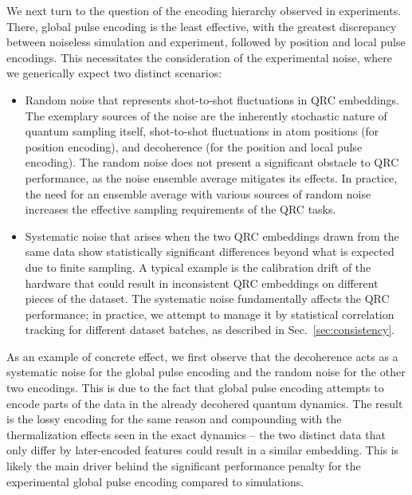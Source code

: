 \documentclass[english,floatfix,twocolumn,showpacs, aps, prx, reprint, superscriptaddress, longbibliography]{revtex4-2}
\begin{document}
We next turn to the question of the encoding hierarchy observed in experiments. There, global pulse encoding is the least effective, with the greatest discrepancy between noiseless simulation and experiment, followed by position and local pulse encodings. This necessitates the consideration of the experimental noise, where we generically expect two distinct scenarios:
\begin{itemize}
    \item Random noise that represents shot-to-shot fluctuations in QRC embeddings. The exemplary sources of the noise are the inherently stochastic nature of quantum sampling itself, shot-to-shot fluctuations in atom positions (for position encoding), and decoherence (for the position and local pulse encoding). The random noise does not present a significant obstacle to QRC performance, as the noise ensemble average mitigates its effects. In practice, the need for an ensemble average with various sources of random noise increases the effective sampling requirements of the QRC tasks.
    \item Systematic noise that arises when the two QRC embeddings drawn from the same data show statistically significant differences beyond what is expected due to finite sampling. A typical example is the calibration drift of the hardware that could result in inconsistent QRC embeddings on different pieces of the dataset. The systematic noise fundamentally affects the QRC performance; in practice, we attempt to manage it by statistical correlation tracking for different dataset batches, as described in Sec.~\ref{sec:consistency}. 
\end{itemize}

As an example of concrete effect, we first observe that the decoherence acts as a systematic noise for the global pulse encoding and the random noise for the other two encodings. This is due to the fact that global pulse encoding attempts to encode parts of the data in the already decohered quantum dynamics. The result is the lossy encoding for the same reason and compounding with the thermalization effects seen in the exact dynamics -- the two distinct data that only differ by later-encoded features could result in a similar embedding. This is likely the main driver behind the significant performance penalty for the experimental global pulse encoding compared to simulations.
\end{document}
